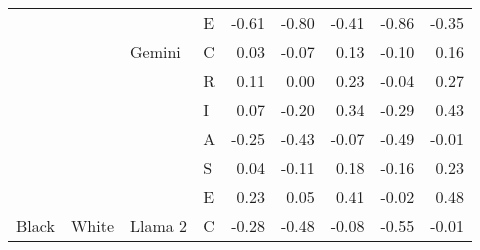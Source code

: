 \begin{table}
\begin{tabular}[t]{llllrrrrr}
 &  &  & E & -0.61 & -0.80 & -0.41 & -0.86 & -0.35\\

 &  & \multirow[t]{-6}{*}{\raggedright\arraybackslash Gemini} & C & 0.03 & -0.07 & 0.13 & -0.10 & 0.16\\

 &  &  & R & 0.11 & 0.00 & 0.23 & -0.04 & 0.27\\

 &  &  & I & 0.07 & -0.20 & 0.34 & -0.29 & 0.43\\

 &  &  & A & -0.25 & -0.43 & -0.07 & -0.49 & -0.01\\

 &  &  & S & 0.04 & -0.11 & 0.18 & -0.16 & 0.23\\

 &  &  & E & 0.23 & 0.05 & 0.41 & -0.02 & 0.48\\

\multirow[t]{-24}{*}{\raggedright\arraybackslash Black} & \multirow[t]{-24}{*}{\raggedright\arraybackslash White} & \multirow[t]{-6}{*}{\raggedright\arraybackslash Llama 2} & C & -0.28 & -0.48 & -0.08 & -0.55 & -0.01\\
\bottomrule
\end{tabular}
\end{table}
